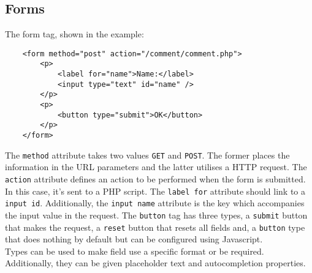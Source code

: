 \newpage

\subsection{Forms}

The form tag, shown in the example: \begin{lstlisting}
    <form method="post" action="/comment/comment.php">
        <p>
            <label for="name">Name:</label>
            <input type="text" id="name" />
        </p>
        <p>
            <button type="submit">OK</button>
        </p>
    </form>
\end{lstlisting} The \texttt{method} attribute takes two values
\texttt{GET} and \texttt{POST}. The former places the
information in the URL parameters and the latter utilises
a HTTP request. \newline
The \texttt{action} attribute defines an action to be
performed when the form is submitted. In this case,
it's sent to a PHP script. \newline
The \texttt{label for} attribute should link to a \texttt{input 
id}. Additionally, the \texttt{input name} attribute is the key
which accompanies the input value in the request. \newline
The \texttt{button} tag has three types, a \texttt{submit} button
that makes the request, a \texttt{reset} button that resets all fields and,
a \texttt{button} type that does nothing by default but can
be configured using Javascript.
\\[\baselineskip]
Types can be used to make field use a specific format or be
required. Additionally, they can be given placeholder text
and autocompletion properties.